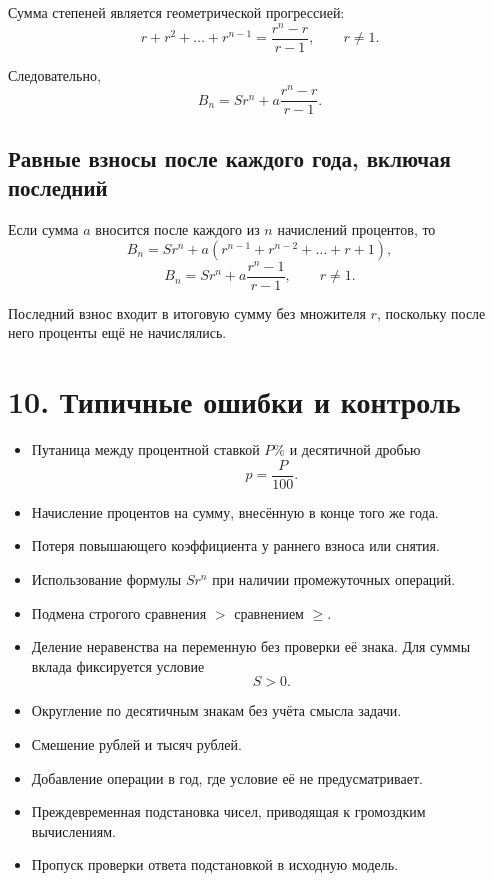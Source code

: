 \documentclass[a4paper,12pt]{article}
\begin{document}
Сумма степеней является геометрической прогрессией:
\[
  r+r^2+\dots+r^{n-1}
  =
  \frac{r^n-r}{r-1},
  \qquad
  r\ne1.
\]

Следовательно,
\[
  B_n
  =
  Sr^n
  +
  a\frac{r^n-r}{r-1}.
\]

\subsection*{Равные взносы после каждого года, включая последний}

Если сумма \(a\) вносится после каждого из \(n\) начислений процентов,
то
\[
  B_n
  =
  Sr^n
  +
  a\left(
    r^{n-1}+r^{n-2}+\dots+r+1
  \right),
\]
\[
  B_n
  =
  Sr^n
  +
  a\frac{r^n-1}{r-1},
  \qquad
  r\ne1.
\]

Последний взнос входит в итоговую сумму без множителя \(r\), поскольку
после него проценты ещё не начислялись.

\section*{10. Типичные ошибки и контроль}

\begin{itemize}
  \item Путаница между процентной ставкой \(P\%\) и десятичной дробью
  \[
    p=\frac{P}{100}.
  \]

  \item Начисление процентов на сумму, внесённую в конце того же года.

  \item Потеря повышающего коэффициента у раннего взноса или снятия.

  \item Использование формулы \(Sr^n\) при наличии промежуточных
  операций.

  \item Подмена строгого сравнения \(>\) сравнением \(\ge\).

  \item Деление неравенства на переменную без проверки её знака.
  Для суммы вклада фиксируется условие
  \[
    S>0.
  \]

  \item Округление по десятичным знакам без учёта смысла задачи.

  \item Смешение рублей и тысяч рублей.

  \item Добавление операции в год, где условие её не предусматривает.

  \item Преждевременная подстановка чисел, приводящая к громоздким
  вычислениям.

  \item Пропуск проверки ответа подстановкой в исходную модель.
\end{itemize}
\end{document}
